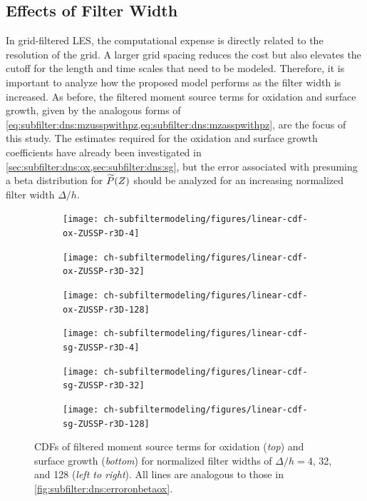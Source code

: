 \subsection{Effects of Filter Width}
\label{sec:subfilter:dns:fw}

In grid-filtered LES, the computational expense is directly related to the resolution of the grid. A larger grid spacing reduces the cost but also elevates the cutoff for the length and time scales that need to be modeled. Therefore, it is important to analyze how the proposed model performs as the filter width is increased. As before, the filtered moment source terms for oxidation and surface growth, given by the analogous forms of \cref{eq:subfilter:dns:mzusspwithpz,eq:subfilter:dns:mzasspwithpz}, are the focus of this study. The estimates required for the oxidation and surface growth coefficients have already been investigated in \cref{sec:subfilter:dns:ox,sec:subfilter:dns:sg}, but the error associated with presuming a beta distribution for $\widetilde{P}(Z)$ should be analyzed for an increasing normalized filter width $\Delta/h$. 

\begin{figure}[ht]
  \centering
  \begin{subfigure}[b]{0.33\linewidth}
    \centering
    \texttt{[image: ch-subfiltermodeling/figures/linear-cdf-ox-ZUSSP-r3D-4]}
  \end{subfigure}%
  \begin{subfigure}[b]{0.33\linewidth}
    \centering
    \texttt{[image: ch-subfiltermodeling/figures/linear-cdf-ox-ZUSSP-r3D-32]}
  \end{subfigure}%
  \begin{subfigure}[b]{0.33\linewidth}
    \centering
    \texttt{[image: ch-subfiltermodeling/figures/linear-cdf-ox-ZUSSP-r3D-128]}
  \end{subfigure}
  \begin{subfigure}[b]{0.33\linewidth}
    \centering
    \texttt{[image: ch-subfiltermodeling/figures/linear-cdf-sg-ZUSSP-r3D-4]}
  \end{subfigure}%
  \begin{subfigure}[b]{0.33\linewidth}
    \centering
    \texttt{[image: ch-subfiltermodeling/figures/linear-cdf-sg-ZUSSP-r3D-32]}
  \end{subfigure}%
  \begin{subfigure}[b]{0.33\linewidth}
    \centering
    \texttt{[image: ch-subfiltermodeling/figures/linear-cdf-sg-ZUSSP-r3D-128]}
  \end{subfigure}
  \caption[Error Associated with \texorpdfstring{$\pz = \beta(Z;\tf{Z},\tf{Z_V})$}{P(Z) = B(Z;Z,ZV)} for Various \texorpdfstring{$\Delta/h$}{D/h}]{CDFs of filtered moment source terms for oxidation (\textit{top}) and surface growth (\textit{bottom}) for normalized filter widths of $\Delta/h = 4$, 32, and 128 (\textit{left to right}). All lines are analogous to those in \cref{fig:subfilter:dns:erroronbetaox}.}
  \label{fig:subfilter:dns:erroronbetafwidth}
\end{figure}

